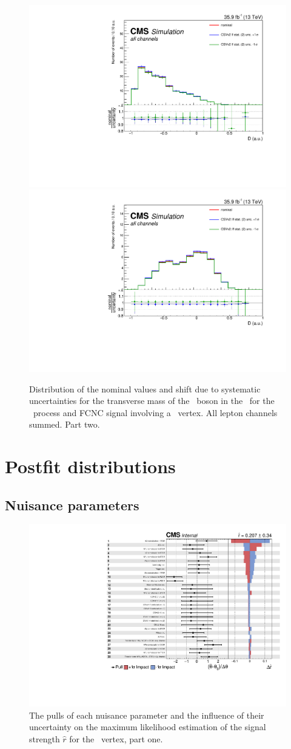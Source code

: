 \begin{figure}[htbp]
{		\includegraphics[width=0.2\linewidth]{6_Search/Figures/SystematicEffect/toppairzct/btagSF_lfstats2BKG}
		\includegraphics[width=0.2\linewidth]{6_Search/Figures/SystematicEffect/toppairzct/btagSF_lfstats2SIG}
	}
	\caption{Distribution of the nominal values and shift due to systematic uncertainties for the transverse mass of the \PW\ boson in the \TTSR\ for the \WZ\ process and FCNC signal involving a \Zct\ vertex. All lepton channels summed. Part two.}
	\label{fig:shiftBDTTTZct}
\end{figure}

\clearpage
\section{Postfit distributions}
\label{app:PostFit}

\subsection{Nuisance parameters}
\begin{figure}[htbp] 
	\centering
	\includegraphics[page=1,width=.99\linewidth,keepaspectratio]{6_Search/Figures/impact/171102Zut.pdf}
	\caption{The pulls of each nuisance parameter and the influence of their uncertainty on the maximum likelihood estimation of the signal strength $\hat{r}$ for the \Zut\ vertex, part one.}
	\label{fig:impactsZut11}
\end{figure}


